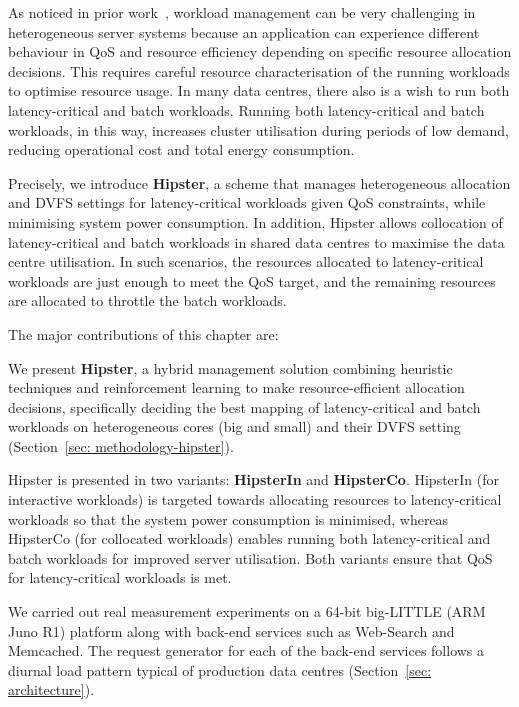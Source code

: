 
 As noticed in prior work~\citep{Petrucci2015Octopus-Man:Computers, Lo2015Heracles,
Kasture2015Rubik, Delimitrou2013Paragon:Datacenters, Vamanan2015TimeTrader:Search,
Zhu2016Dirigent}, workload management can be very challenging in heterogeneous server
systems because an application can experience different behaviour in QoS and resource
efficiency depending on specific resource allocation decisions. This requires careful
resource characterisation of the running workloads to optimise resource usage. In many
data centres, there also is a wish to run both latency-critical and batch workloads.
Running both latency-critical and batch workloads, in this way, increases cluster
utilisation during periods of low demand, reducing operational cost and total energy
consumption.

 Precisely, we introduce \textbf{Hipster}, a scheme that manages
heterogeneous \muc allocation and DVFS settings for latency-critical workloads given QoS
constraints, while minimising system power consumption. In addition, Hipster allows
collocation of latency-critical and batch workloads in shared data centres to maximise the
data centre utilisation. In such scenarios, the resources allocated to latency-critical
workloads are just enough to meet the QoS target, and the remaining resources are
allocated to throttle the batch workloads.

The major contributions of this chapter are: 

 {\small{}} We present \textbf{Hipster}, a hybrid management
solution combining  heuristic techniques and reinforcement learning to make
resource-efficient allocation decisions, specifically deciding the best mapping of
latency-critical and batch workloads on heterogeneous cores (big and small) and their DVFS
setting (Section~\ref{sec: methodology-hipster}).

 {\small{}} Hipster is presented in two variants: \textbf{HipsterIn} and
\textbf{HipsterCo}. HipsterIn (for interactive workloads) is targeted towards allocating
resources to latency-critical workloads so that the system power consumption is minimised,
whereas HipsterCo (for collocated workloads)  enables running both latency-critical and
batch workloads for improved server utilisation. Both variants ensure that QoS for
latency-critical workloads is met.  

{\small{}} We carried out real measurement experiments on a 64-bit big-LITTLE
(ARM Juno R1) platform along with back-end services such as Web-Search and Memcached. The
request generator for each of the back-end services follows a diurnal load pattern typical
of production data centres (Section~\ref{sec: architecture}).  


